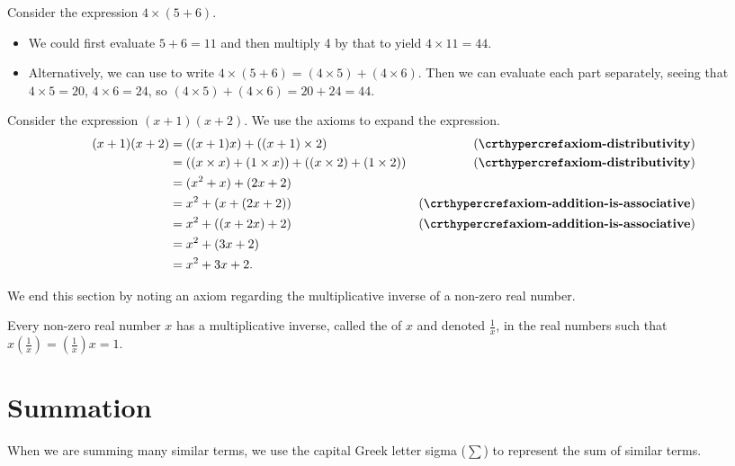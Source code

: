 \begin{example}
    Consider the expression $4\times(5+6)$.
    \begin{itemize}
        \item We could first evaluate $5+6=11$ and then multiply 4 by that to yield $4\times11=44$.
        \item Alternatively, we can use  to write $4\times(5+6) = (4\times5)+(4\times6)$. Then we can evaluate each part separately, seeing that $4\times5 = 20$, $4\times6 = 24$, so $(4\times5)+(4\times6) = 20+24=44$.
    \end{itemize}
\end{example}

\begin{example}
    Consider the expression $(x+1)(x+2)$. We use the axioms to expand the expression.
    \begin{align*}
        (x+1)(x+2) &= ((x+1)x) + ((x+1)\times2) & (\myref{axiom-distributivity})\\
        &= ((x\times x) + (1\times x)) + ((x\times2) + (1\times2)) & (\myref{axiom-distributivity})\\
        &= (x^2+x) + (2x+2)\\
        &= x^2+(x + (2x+2)) & (\myref{axiom-addition-is-associative})\\
        &= x^2+((x + 2x)+2) & (\myref{axiom-addition-is-associative})\\
        &= x^2 + (3x+2)\\
        &= x^2 + 3x + 2.
    \end{align*}
\end{example}

We end this section by noting an axiom regarding the multiplicative inverse of a non-zero real number.

\begin{axiom}\label{axiom-reciprocal}
    Every non-zero real number $x$ has a multiplicative inverse, called the  of $x$ and denoted $\frac1x$, in the real numbers such that $x\left(\frac1x\right) = \left(\frac1x\right)x = 1$.
\end{axiom}

\section{Summation}
When we are summing many similar terms, we use the capital Greek letter sigma ($\sum$) to represent the sum of similar terms.

